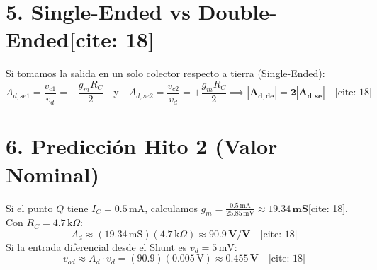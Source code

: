 \documentclass[11pt, a4paper]{article}
\begin{document}
\section*{5. Single-Ended vs Double-Ended[cite: 18]}
Si tomamos la salida en un solo colector respecto a tierra (Single-Ended):
\begin{equation*}
    A_{d,se1} = \frac{v_{c1}}{v_d} = -\frac{g_m R_C}{2} \quad \text{y} \quad A_{d,se2} = \frac{v_{c2}}{v_d} = +\frac{g_m R_C}{2} \implies \mathbf{|A_{d,de}| = 2|A_{d,se}|} \quad \text{[cite: 18]}
\end{equation*}

\section*{6. Predicción Hito 2 (Valor Nominal)}
Si el punto $Q$ tiene $I_{C} = 0.5\,\text{mA}$, calculamos $g_m = \frac{0.5\,\text{mA}}{25.85\,\text{mV}} \approx \mathbf{19.34\,\text{mS}}$[cite: 18].
Con $R_C = 4.7\,\text{k}\Omega$:
\begin{equation*}
    A_d \approx (19.34\,\text{mS})(4.7\,\text{k}\Omega) \approx \mathbf{90.9\,\text{V/V}} \quad \text{[cite: 18]}
\end{equation*}
Si la entrada diferencial desde el Shunt es $v_d = 5\,\text{mV}$:
\begin{equation*}
    v_{od} \approx A_d \cdot v_d = (90.9)(0.005\,\text{V}) \approx \mathbf{0.455\,\text{V}} \quad \text{[cite: 18]}
\end{equation*}
\end{document}
